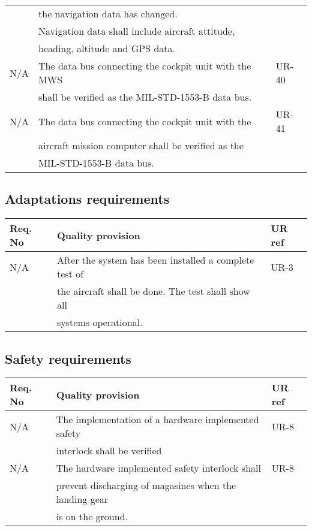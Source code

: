 \begin{center}
\begin{tabular}{ | l | l | l |}
			& the navigation data has changed. 						&\\
			& Navigation data shall include aircraft attitude, 		&\\
			& heading, altitude and GPS data. 						&\\ \hline
		N/A & The data bus connecting the cockpit unit with the MWS & UR-40 \\
			& shall be verified as the MIL-STD-1553-B data bus. 	&\\ \hline
		N/A & The data bus connecting the cockpit unit with the 	& UR-41 \\
			& aircraft mission computer shall be verified as the  	&\\
			& MIL-STD-1553-B data bus. 								&\\ \hline
\hline
    \end{tabular}
\end{center}

\subsection{Adaptations requirements}
\begin{center}
    \begin{tabular}{ | l | l | l |}
    \hline
    Req. No & Quality provision  									& UR ref \\ \hline
		N/A & After the system has been installed a complete test of& UR-3 \\
			& the aircraft shall be done. The test shall show all 	&\\
			& systems operational. 									&\\ \hline
    \hline
    \end{tabular}
\end{center}


\subsection{Safety requirements}
\begin{center}
    \begin{tabular}{ | l | l | l |}
    \hline
    Req. No & Quality provision  									& UR ref \\ \hline
		N/A & The implementation of a hardware implemented safety  	& UR-8 \\ 
			& interlock shall be verified 							&\\ \hline
		N/A & The hardware implemented safety interlock shall 		& UR-8\\ 
			& prevent discharging of magasines when the landing gear&\\ 
			& is on the ground.										&\\ \hline	
    \hline
    \end{tabular}
\end{center}



